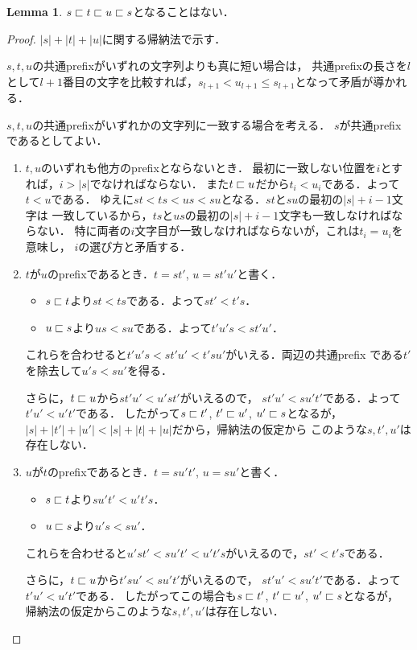 \documentclass{scrartcl}
\theoremstyle{definition}
\newtheorem{lemma}{Lemma}
\begin{document}
\begin{lemma}
  $s \sqsubset t \sqsubset u \sqsubset s$となることはない．
\end{lemma}
\begin{proof}
  $|s| + |t| + |u|$に関する帰納法で示す．

  $s, t, u$の共通prefixがいずれの文字列よりも真に短い場合は，
  共通prefixの長さを$l$として$l+1$番目の文字を比較すれば，$s_{l+1} < u_{l+1}
  \le s_{l+1}$となって矛盾が導かれる．

  $s, t, u$の共通prefixがいずれかの文字列に一致する場合を考える．
  $s$が共通prefixであるとしてよい．
  \begin{enumerate}
  \item $t, u$のいずれも他方のprefixとならないとき．
    最初に一致しない位置を$i$とすれば，$i > |s|$でなければならない．
    また$t \sqsubset u$だから$t_i < u_i$である．よって$t < u$である．
    ゆえに$st < ts < us < su$となる．$st$と$su$の最初の$|s|+i-1$文字は
    一致しているから，$ts$と$us$の最初の$|s|+i-1$文字も一致しなければならない．
    特に両者の$i$文字目が一致しなければならないが，これは$t_i = u_i$を意味し，
    $i$の選び方と矛盾する．
  \item $t$が$u$のprefixであるとき．$t = st'$, $u = st'u'$と書く．
    \begin{itemize}
    \item $s \sqsubset t$より$st < ts$である．よって$st' < t's$．
    \item $u \sqsubset s$より$us < su$である．よって$t'u's < st'u'$．
    \end{itemize}
    これらを合わせると$t'u's < st'u' < t'su'$がいえる．両辺の共通prefix
    である$t'$を除去して$u's < su'$を得る．

    さらに，$t \sqsubset u$から$st'u' < u'st'$がいえるので，
    $st'u' < su't'$である．よって$t'u' < u't'$である．
    したがって$s \sqsubset t'$, $t' \sqsubset u'$, $u' \sqsubset s$となるが，
    $|s| + |t'| + |u'| < |s| + |t| + |u|$だから，帰納法の仮定から
    このような$s, t', u'$は存在しない．
  \item $u$が$t$のprefixであるとき．$t = su't'$, $u = su'$と書く．
    \begin{itemize}
    \item $s \sqsubset t$より$su't' < u't's$．
    \item $u \sqsubset s$より$u's < su'$．
    \end{itemize}
    これらを合わせると$u'st' < su't' < u't's$がいえるので，$st' < t's$である．

    さらに，$t \sqsubset u$から$t'su' < su't'$がいえるので，
    $st'u' < su't'$である．よって$t'u' < u't'$である．
    したがってこの場合も$s \sqsubset t'$, $t' \sqsubset u'$, $u' \sqsubset s$となるが，
    帰納法の仮定からこのような$s, t', u'$は存在しない．
  \end{enumerate}
\end{proof}
\end{document}
